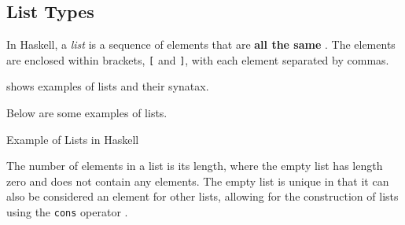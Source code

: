 \subsection{List Types}\label{subsec:List_Types}
\begin{definition}[List]\label{def:List}
  In Haskell, a \emph{list} is a sequence of elements that are \textbf{all the same }.
  The elements are enclosed within brackets, \texttt{[} and \texttt{]}, with each element separated by commas.

   shows examples of lists and their synatax.
\end{definition}

Below are some examples of lists.
\begin{listing}[h!tbp]
\caption{Example of Lists in Haskell}
\label{lst:List_Examples}
\end{listing}

The number of elements in a list is its length, where the empty list has length zero and does not contain any elements.
The empty list is unique in that it can also be considered an element for other lists, allowing for the construction of lists using the \texttt{cons} operator \haskellinline{:}.


